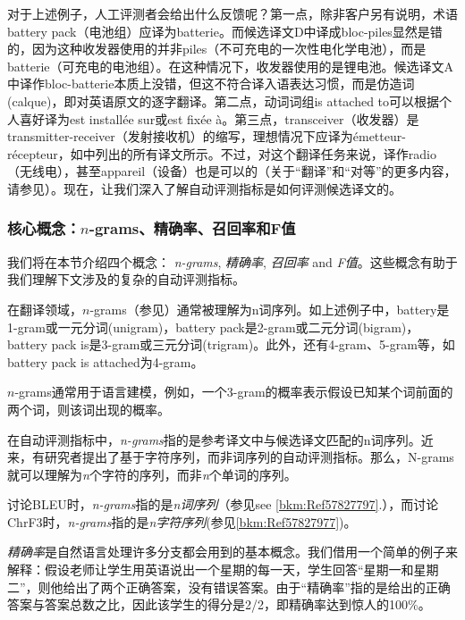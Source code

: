 \documentclass[output=paper]{langscibook}
\begin{document}
对于上述例子，人工评测者会给出什么反馈呢？第一点，除非客户另有说明，术语battery pack（电池组）应译为batterie。而候选译文D中译成bloc-piles显然是错的，因为这种收发器使用的并非piles（不可充电的一次性电化学电池），而是batterie（可充电的电池组）。在这种情况下，收发器使用的是锂电池。候选译文A中译作bloc-batterie本质上没错，但这不符合译入语表达习惯，而是仿造词(calque)，即对英语原文的逐字翻译。第二点，动词词组is attached to可以根据个人喜好译为est installée sur或est fixée à。第三点，transceiver（收发器）是transmitter-receiver（发射接收机）的缩写，理想情况下应译为émetteur-récepteur，如中列出的所有译文所示。不过，对这个翻译任务来说，译作radio（无线电），甚至appareil（设备）也是可以的（关于“翻译”和“对等”的更多内容，请参见）。现在，让我们深入了解自动评测指标是如何评测候选译文的。


\subsubsection{核心概念：$n$-grams、精确率、召回率和F值}
我们将在本节介绍四个概念： \textit{n-grams}, \textit{精确率}, \textit{召回率} and \textit{F值}。这些概念有助于我们理解下文涉及的复杂的自动评测指标。


在翻译领域，$n$-grams（参见）通常被理解为n词序列。如上述例子中，battery是1-gram或一元分词(unigram)，battery pack是2-gram或二元分词(bigram)，battery pack is是3-gram或三元分词(trigram)。此外，还有4-gram、5-gram等，如battery pack is attached为4-gram。

$n$-grams通常用于语言建模，例如，一个3-gram的概率表示假设已知某个词前面的两个词，则该词出现的概率。

在自动评测指标中，\textit{n-grams}指的是参考译文中与候选译文匹配的n词序列。近来，有研究者提出了基于字符序列，而非词序列的自动评测指标。那么，N-grams就可以理解为\textit{n}个字符的序列，而非\textit{n}个单词的序列。

讨论BLEU时，\textit{n-grams}指的是\textit{n词序列}（参见see \ref{bkm:Ref57827797}.），而讨论ChrF3时，\textit{n-grams}指的是\textit{n字符序列}(参见\ref{bkm:Ref57827977})。


\textit{精确率}是自然语言处理许多分支都会用到的基本概念。我们借用一个简单的例子来解释：假设老师让学生用英语说出一个星期的每一天，学生回答“星期一和星期二”，则他给出了两个正确答案，没有错误答案。由于“精确率”指的是给出的正确答案与答案总数之比，因此该学生的得分是2/2，即精确率达到惊人的100\%。
\end{document}
